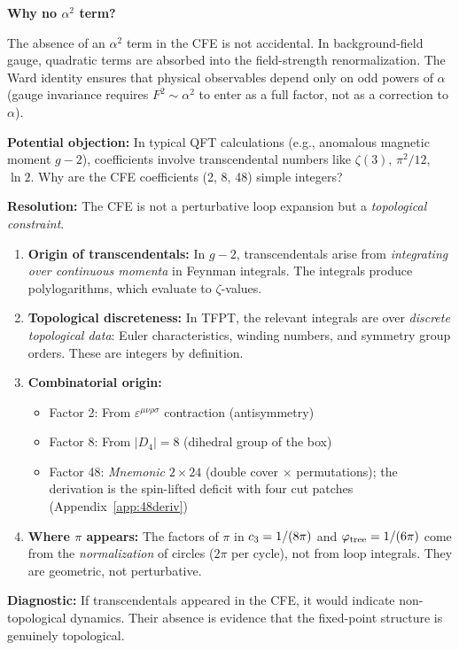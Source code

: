 \textbf{Why no $\alpha^2$ term?}

The absence of an $\alpha^2$ term in the CFE is not accidental. In background-field gauge, 
quadratic terms are absorbed into the field-strength renormalization. The Ward identity 
ensures that physical observables depend only on odd powers of $\alpha$ (gauge invariance 
requires $F^2 \sim \alpha^2$ to enter as a full factor, not as a correction to $\alpha$).

\begin{tcolorbox}[colback=purple!3, colframe=purple!50!black, 
    title={\textbf{Why Integer Coefficients? (No $\zeta(3)$, $\ln 2$, etc.)}}, fonttitle=\bfseries\small]
\textbf{Potential objection:} In typical QFT calculations (e.g., anomalous magnetic moment $g-2$), 
coefficients involve transcendental numbers like $\zeta(3)$, $\pi^2/12$, $\ln 2$. Why are the 
CFE coefficients (2, 8, 48) simple integers?

\textbf{Resolution:} The CFE is not a perturbative loop expansion but a \emph{topological constraint}.

\begin{enumerate}[leftmargin=1.5em, topsep=2pt, itemsep=1pt]
    \item \textbf{Origin of transcendentals:} In $g-2$, transcendentals arise from 
        \emph{integrating over continuous momenta} in Feynman integrals. The integrals 
        produce polylogarithms, which evaluate to $\zeta$-values.
    
    \item \textbf{Topological discreteness:} In TFPT, the relevant integrals are over 
        \emph{discrete topological data}: Euler characteristics, winding numbers, and 
        symmetry group orders. These are integers by definition.
    
    \item \textbf{Combinatorial origin:}
        \begin{itemize}[leftmargin=1em, topsep=1pt, itemsep=1pt]
            \item Factor 2: From $\varepsilon^{\mu\nu\rho\sigma}$ contraction (antisymmetry)
            \item Factor 8: From $|D_4| = 8$ (dihedral group of the box)
            \item Factor 48: \emph{Mnemonic} $2 \times 24$ (double cover $\times$ permutations); the derivation is the spin-lifted deficit with four cut patches (Appendix~\ref{app:48deriv})
        \end{itemize}
    
    \item \textbf{Where $\pi$ appears:} The factors of $\pi$ in $c_3 = 1/(8\pi)$ and 
        $\varphi_{\mathrm{tree}} = 1/(6\pi)$ come from the \emph{normalization} of circles ($2\pi$ per cycle), 
        not from loop integrals. They are geometric, not perturbative.
\end{enumerate}

\textbf{Diagnostic:} If transcendentals appeared in the CFE, it would indicate non-topological 
dynamics. Their absence is evidence that the fixed-point structure is genuinely topological.
\end{tcolorbox}

